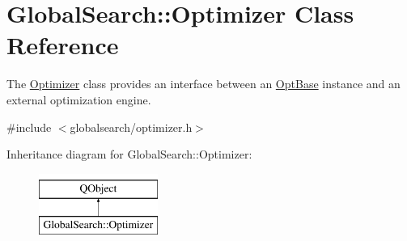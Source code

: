 \hypertarget{classGlobalSearch_1_1Optimizer}{\section{Global\-Search\-:\-:Optimizer Class Reference}
\label{classGlobalSearch_1_1Optimizer}
}


The \hyperlink{classGlobalSearch_1_1Optimizer}{Optimizer} class provides an interface between an \hyperlink{classGlobalSearch_1_1OptBase}{Opt\-Base} instance and an external optimization engine.  




{\ttfamily \#include $<$globalsearch/optimizer.\-h$>$}

Inheritance diagram for Global\-Search\-:\-:Optimizer\-:\begin{figure}[H]
\begin{center}
\leavevmode
\includegraphics[height=2.000000cm]{classGlobalSearch_1_1Optimizer}
\end{center}
\end{figure}
